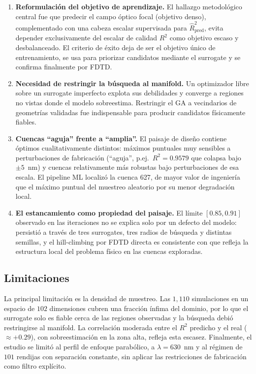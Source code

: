 \begin{enumerate}
    \item \textbf{Reformulación del objetivo de aprendizaje.} El hallazgo metodológico central fue que predecir el campo óptico focal (objetivo denso), complementado con una cabeza escalar supervisada para $\hat{R}^2_{\text{pred}}$, evita depender exclusivamente del escalar de calidad $R^2$ como objetivo escaso y desbalanceado. El criterio de éxito deja de ser el objetivo único de entrenamiento, se usa para priorizar candidatos mediante el surrogate y se confirma finalmente por FDTD.

    \item \textbf{Necesidad de restringir la búsqueda al manifold.} Un optimizador libre sobre un surrogate imperfecto explota sus debilidades y converge a regiones no vistas donde el modelo sobreestima. Restringir el GA a vecindarios de geometrías validadas fue indispensable para producir candidatos físicamente fiables.

    \item \textbf{Cuencas ``aguja'' frente a ``amplia''.} El paisaje de diseño contiene óptimos cualitativamente distintos: máximos puntuales muy sensibles a perturbaciones de fabricación (``aguja'', p.ej.\ $R^2 = 0.9579$ que colapsa bajo $\pm 5$~nm) y cuencas relativamente más robustas bajo perturbaciones de esa escala. El pipeline ML localizó la cuenca 627, de mayor valor de ingeniería que el máximo puntual del muestreo aleatorio por su menor degradación local.

    \item \textbf{El estancamiento como propiedad del paisaje.} El límite $[0.85, 0.91]$ observado en las iteraciones no se explica solo por un defecto del modelo: persistió a través de tres surrogates, tres radios de búsqueda y distintas semillas, y el hill-climbing por FDTD directa es consistente con que refleja la estructura local del problema físico en las cuencas exploradas.
\end{enumerate}

\subsection{Limitaciones}\label{subsec:limitaciones}

La principal limitación es la densidad de muestreo. Las $1{,}110$ simulaciones en un espacio de $102$ dimensiones cubren una fracción ínfima del dominio, por lo que el surrogate solo es fiable cerca de las regiones observadas y la búsqueda debió restringirse al manifold. La correlación moderada entre el $R^2$ predicho y el real ($\approx +0.29$), con sobreestimación en la zona alta, refleja esta escasez. Finalmente, el estudio se limitó al perfil de enfoque parabólico, a $\lambda = 630$~nm y al régimen de $101$ rendijas con separación constante, sin aplicar las restricciones de fabricación como filtro explícito.

